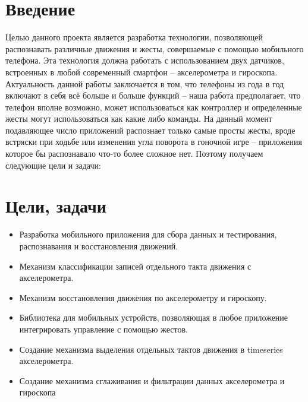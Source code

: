 \section{Введение}

Целью данного проекта является разработка технологии, позволяющей распознавать различные движения и жесты, совершаемые с помощью мобильного телефона. Эта технология должна работать с использованием двух датчиков, встроенных в любой современный смартфон – акселерометра и гироскопа.
Актуальность данной работы заключается в том, что телефоны из года в год включают в себя всё больше и больше функций – наша работа предполагает, что телефон вполне возможно, может использоваться как контроллер и определенные жесты могут использоваться как какие либо команды.
На данный момент подавляющее число приложений распознает только самые просты жесты, вроде встряски при ходьбе или изменения угла поворота в гоночной игре – приложения которое бы распознавало что-то более сложное нет.
Поэтому получаем следующие цели и задачи:

\section{Цели, задачи}
\begin{itemize}
    \item Разработка мобильного приложения для сбора данных и тестирования, распознавания и восстановления движений.
    \item Механизм классификации записей отдельного такта движения с акселерометра.
    \item Механизм восстановления движения по акселерометру и гироскопу.
    \item Библиотека для мобильных устройств, позволяющая в любое приложение интегрировать управление с помощью жестов. 
    \item Создание механизма выделения отдельных тактов движения в timeseries акселерометра.
    \item Создание механизма сглаживания и фильтрации данных акселерометра и гироскопа
\end{itemize}